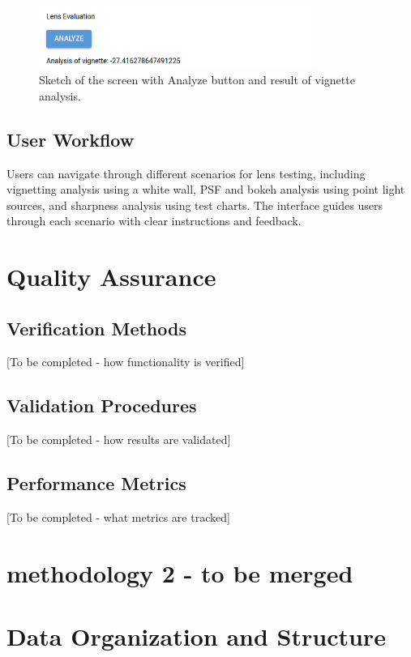 \begin{figure}[h]
\centering
\includegraphics[width=0.8\textwidth]{Images/ui2.png}
\caption{Sketch of the screen with Analyze button and result of vignette analysis.}
\label{fig:ui_analysis_screen}
\end{figure}

\subsection{User Workflow}
Users can navigate through different scenarios for lens testing, including vignetting analysis using a white wall, PSF and bokeh analysis using point light sources, and sharpness analysis using test charts. The interface guides users through each scenario with clear instructions and feedback.

\section{Quality Assurance}

\subsection{Verification Methods}
[To be completed - how functionality is verified]

\subsection{Validation Procedures}
[To be completed - how results are validated]

\subsection{Performance Metrics}
[To be completed - what metrics are tracked]


\section{methodology 2 - to be merged}
\section{Data Organization and Structure}

